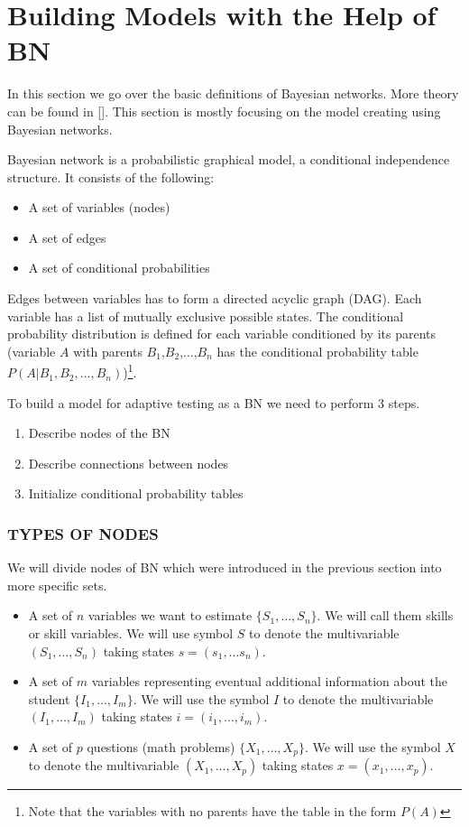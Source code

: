\section{Building Models with the Help of BN}

In this section we go over the basic definitions of Bayesian networks. More theory can be found in []. This section is mostly focusing on the model creating using Bayesian networks.

Bayesian network is a probabilistic graphical model, a conditional independence structure. It consists of the following: 
\begin{itemize}
	\item A set of variables (nodes)
	\item A set of edges
	\item A set of conditional probabilities
\end{itemize}
Edges between variables has to form a directed acyclic graph (DAG). Each variable has a list of mutually exclusive possible states. The conditional probability distribution is defined for each variable conditioned by its parents (variable $A$ with parents $B_1$,$B_2$,...,$B_n$ has the conditional probability table ${P(A|B_1,B_2,...,B_n)}$)\footnote{Note that the variables with no parents have the table in the form $P(A)$}. 

To build a model for adaptive testing as a BN we need to perform 3 steps.
\begin{enumerate}
	\item Describe nodes of the BN
	\item Describe connections between nodes
	\item Initialize conditional probability tables
\end{enumerate}
 
\subsubsection{TYPES OF NODES}
We will divide nodes of BN which were introduced in the previous section into more specific sets. 
\begin{itemize} 
\item A set of $n$ variables we want to estimate $\{S_1,\ldots,S_n\}$. 
We will call them skills or skill variables. We will use symbol $S$ to denote the multivariable $(S_1,\ldots,S_n)$ taking states $s = (s_1,\ldots s_n)$. 
\item A set of $m$ variables representing eventual additional information about the student $\{I_1,\ldots,I_m\}$.  
We will use the symbol $I$ to denote the multivariable $(I_1,\ldots,I_m)$ taking states $i = (i_1,\ldots,i_m)$.
\item A set of $p$ questions (math problems) $\{X_1,\ldots,X_p\}$.  
We will use the symbol $X$ to denote the multivariable $(X_1,\ldots,X_p)$ taking states $x = (x_1,\ldots,x_p)$.
\end{itemize}

